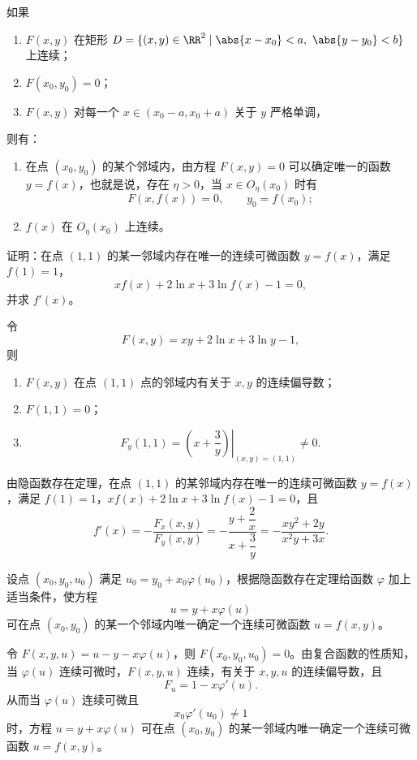 \begin{xproposition}[20.1.2]
如果
\begin{enumerate}[label=(\arabic*)]
  \item $F(x,y)$ 在矩形 $D=\{(x,y)\in\RR^2\mid \abs{x-x_0}<a,\ \abs{y-y_0}<b\}$ 上连续；
  \item $F(x_0,y_0)=0$；
  \item $F(x,y)$ 对每一个 $x\in(x_0-a,x_0+a)$ 关于 $y$ 严格单调，
\end{enumerate}
则有：
\begin{enumerate}[label=(\arabic*)]
  \item 在点 $(x_0,y_0)$ 的某个邻域内，由方程 $F(x,y)=0$ 可以确定唯一的函数 $y=f(x)$，也就是说，存在 $\eta>0$，当 $x\in O_\eta(x_0)$ 时有
  \[
    F(x,f(x))=0,\qquad y_0=f(x_0);
  \]
  \item $f(x)$ 在 $O_\eta(x_0)$ 上连续。
\end{enumerate}
\end{xproposition}

\begin{xexample}[20.1.1]
证明：在点 $(1,1)$ 的某一邻域内存在唯一的连续可微函数 $y=f(x)$，满足 $f(1)=1$，
\[
  xf(x)+2\ln x+3\ln f(x)-1=0,
\]
并求 $f'(x)$。
\end{xexample}
\begin{xsolution}
令
\[
  F(x,y)=xy+2\ln x+3\ln y-1,
\]
则
\begin{enumerate}[label=(\arabic*)]
  \item $F(x,y)$ 在点 $(1,1)$ 点的邻域内有关于 $x,y$ 的连续偏导数；
  \item $F(1,1)=0$；
  \item
  \[
    F_y(1,1)=\left.\left(x+\frac{3}{y}\right)\right|_{(x,y)=(1,1)}\ne0.
  \]
\end{enumerate}
由隐函数存在定理，在点 $(1,1)$ 的某邻域内存在唯一的连续可微函数 $y=f(x)$，满足 $f(1)=1$，$xf(x)+2\ln x+3\ln f(x)-1=0$，且
\[
  f'(x)=-\frac{F_x(x,y)}{F_y(x,y)}
  =-\frac{y+\dfrac{2}{x}}{x+\dfrac{3}{y}}
  =-\frac{xy^2+2y}{x^2y+3x}.
\]
\end{xsolution}

\begin{xexample}[20.1.2]
设点 $(x_0,y_0,u_0)$ 满足 $u_0=y_0+x_0\varphi(u_0)$，根据隐函数存在定理给函数 $\varphi$ 加上适当条件，使方程
\[
  u=y+x\varphi(u)
\]
可在点 $(x_0,y_0)$ 的某一个邻域内唯一确定一个连续可微函数 $u=f(x,y)$。
\end{xexample}
\begin{xsolution}
令 $F(x,y,u)=u-y-x\varphi(u)$，则 $F(x_0,y_0,u_0)=0$。由复合函数的性质知，当 $\varphi(u)$ 连续可微时，$F(x,y,u)$ 连续，有关于 $x,y,u$ 的连续偏导数，且
\[
  F_u=1-x\varphi'(u).
\]
从而当 $\varphi(u)$ 连续可微且
\[
  x_0\varphi'(u_0)\ne1
\]
时，方程 $u=y+x\varphi(u)$ 可在点 $(x_0,y_0)$ 的某一邻域内唯一确定一个连续可微函数 $u=f(x,y)$。
\end{xsolution}

